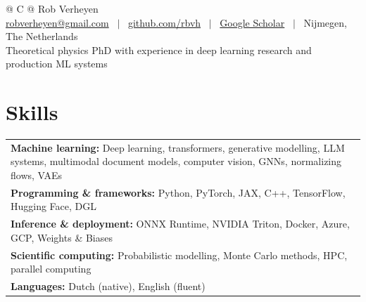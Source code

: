 \documentclass[a4paper,10pt]{article}
\begin{document}
\fontsize{10.5pt}{11.8pt}\selectfont
\RaggedRight
{}
\setlength{\parskip}{3pt}
\pagestyle{empty}

\begin{tabularx}{\linewidth}{@{} C @{}}
\huge{Rob Verheyen} \\[2pt]
\href{mailto:robverheyen@gmail.com}{robverheyen@gmail.com} \ $|$ \
\href{https://github.com/rbvh}{github.com/rbvh} \ $|$ \
\href{https://scholar.google.com/citations?user=MRTAm7UAAAAJ}{Google Scholar} \ $|$ \
Nijmegen, The Netherlands \\[3pt]
Theoretical physics PhD with experience in deep learning research and production ML systems
\end{tabularx}

\section{Skills}
\begin{tabularx}{\linewidth}{@{}X@{}}
\textbf{Machine learning:} Deep learning, transformers, generative modelling, LLM systems, multimodal document models, computer vision, GNNs, normalizing flows, VAEs \\
\textbf{Programming \& frameworks:} Python, PyTorch, JAX, C++, TensorFlow, Hugging Face, DGL \\
\textbf{Inference \& deployment:} ONNX Runtime, NVIDIA Triton, Docker, Azure, GCP, Weights \& Biases \\
\textbf{Scientific computing:} Probabilistic modelling, Monte Carlo methods, HPC, parallel computing \\
\textbf{Languages:} Dutch (native), English (fluent) \\
\end{tabularx}
\end{document}
